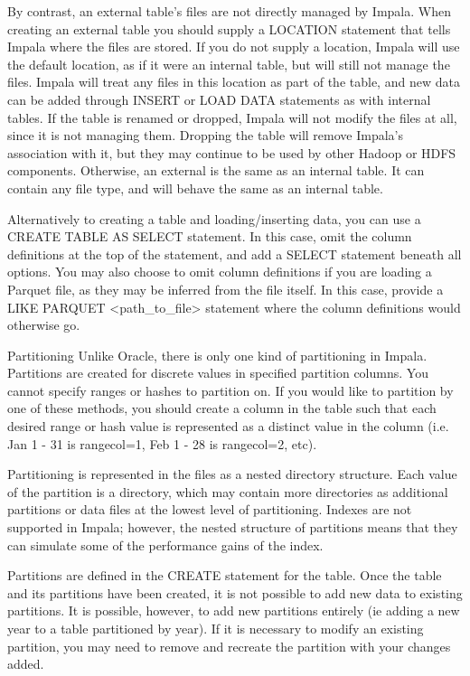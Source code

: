 \documentclass[onecolumn, draftclsnofoot,10pt, compsoc]{IEEEtran}
\begin{document}
By contrast, an external table’s files are not directly managed by Impala. 
When creating an external table you should supply a LOCATION statement that tells Impala where the files are stored. 
If you do not supply a location, Impala will use the default location, as if it were an internal table, but will still not manage the files. 
Impala will treat any files in this location as part of the table, and new data can be added through INSERT or LOAD DATA statements as with internal tables. 
If the table is renamed or dropped, Impala will not modify the files at all, since it is not managing them. 
Dropping the table will remove Impala’s association with it, but they may continue to be used by other Hadoop or HDFS components.
Otherwise, an external is the same as an internal table. 
It can contain any file type, and will behave the same as an internal table.

Alternatively to creating a table and loading/inserting data, you can use a CREATE TABLE AS SELECT statement.
In this case, omit the column definitions at the top of the statement, and add a SELECT statement beneath all options. 
You may also choose to omit column definitions if you are loading a Parquet file, as they may be inferred from the file itself. 
In this case, provide a LIKE PARQUET <path\_to\_file> statement where the column definitions would otherwise go. 

Partitioning
Unlike Oracle, there is only one kind of partitioning in Impala.
Partitions are created for discrete values in specified partition columns.
You cannot specify ranges or hashes to partition on. 
If you would like to partition by one of these methods, you should create a column in the table such that each desired range or hash value is represented as a distinct value in the column (i.e. Jan 1 - 31 is rangecol=1, Feb 1 - 28 is rangecol=2, etc). 

Partitioning is represented in the files as a nested directory structure. 
Each value of the partition is a directory, which may contain more directories as additional partitions or data files at the lowest level of partitioning.
Indexes are not supported in Impala; however, the nested structure of partitions means that they can simulate some of the performance gains of the index.

Partitions are defined in the CREATE statement for the table.
Once the table and its partitions have been created, it is not possible to add new data to existing partitions. 
It is possible, however, to add new partitions entirely (ie adding a new year to a table partitioned by year). 
If it is necessary to modify an existing partition, you may need to remove and recreate the partition with your changes added. 
\end{document}
